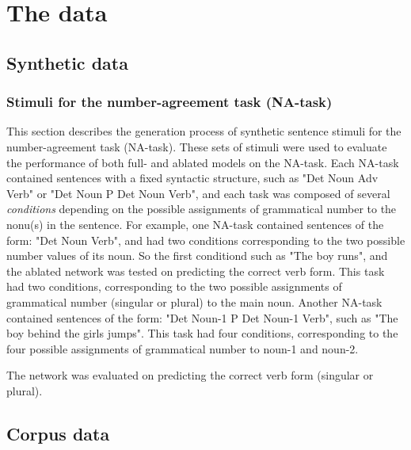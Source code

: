\section{The data}
\lipsum[1]

\subsection{Synthetic data}

\subsubsection{Stimuli for the number-agreement task (NA-task)}
This section describes the generation process of synthetic sentence stimuli for the number-agreement task (NA-task). These sets of stimuli were used to evaluate the performance of both full- and ablated models on the NA-task. Each NA-task contained sentences with a fixed syntactic structure, such as "Det Noun Adv Verb" or "Det Noun P Det Noun Verb", and each task was composed of several \textit{conditions} depending on the possible assignments of grammatical number to the nonu(s) in the sentence. For example, one NA-task contained sentences of the form: "Det Noun Verb", and had two conditions corresponding to the two possible number values of its noun. So the first conditiond such as "The boy runs", and the ablated network was tested on predicting the correct verb form. This task had two conditions, corresponding to the two possible assignments of grammatical number (singular or plural) to the main noun. Another NA-task contained sentences of the form: "Det Noun-1 P Det Noun-1 Verb", such as "The boy behind the girls jumps". This task had four conditions, corresponding to the four possible assignments of grammatical number to noun-1 and noun-2.


The network was evaluated on predicting the correct verb form (singular or plural).


\subsection{Corpus data}
\lipsum[1]
